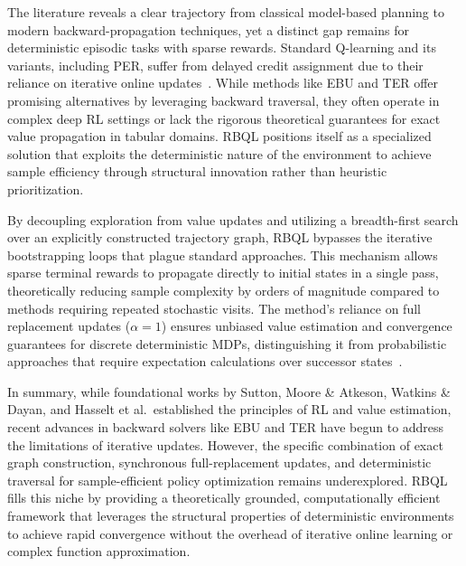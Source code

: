 \documentclass[manuscript, screen, review]{jair}
\begin{document}
The literature reveals a clear trajectory from classical model-based planning to modern backward-propagation techniques, yet a distinct gap remains for deterministic episodic tasks with sparse rewards. Standard Q-learning and its variants, including PER, suffer from delayed credit assignment due to their reliance on iterative online updates~\cite{Meyn2024ThePB}. While methods like EBU and TER offer promising alternatives by leveraging backward traversal, they often operate in complex deep RL settings or lack the rigorous theoretical guarantees for exact value propagation in tabular domains. RBQL positions itself as a specialized solution that exploits the deterministic nature of the environment to achieve sample efficiency through structural innovation rather than heuristic prioritization.

By decoupling exploration from value updates and utilizing a breadth-first search over an explicitly constructed trajectory graph, RBQL bypasses the iterative bootstrapping loops that plague standard approaches. This mechanism allows sparse terminal rewards to propagate directly to initial states in a single pass, theoretically reducing sample complexity by orders of magnitude compared to methods requiring repeated stochastic visits. The method's reliance on full replacement updates ($\alpha=1$) ensures unbiased value estimation and convergence guarantees for discrete deterministic MDPs, distinguishing it from probabilistic approaches that require expectation calculations over successor states~\cite{Diekhoff2024RecursiveBQ}.

In summary, while foundational works by Sutton, Moore \& Atkeson, Watkins \& Dayan, and Hasselt et al.\ established the principles of RL and value estimation, recent advances in backward solvers like EBU and TER have begun to address the limitations of iterative updates. However, the specific combination of exact graph construction, synchronous full-replacement updates, and deterministic traversal for sample-efficient policy optimization remains underexplored. RBQL fills this niche by providing a theoretically grounded, computationally efficient framework that leverages the structural properties of deterministic environments to achieve rapid convergence without the overhead of iterative online learning or complex function approximation.
\end{document}

